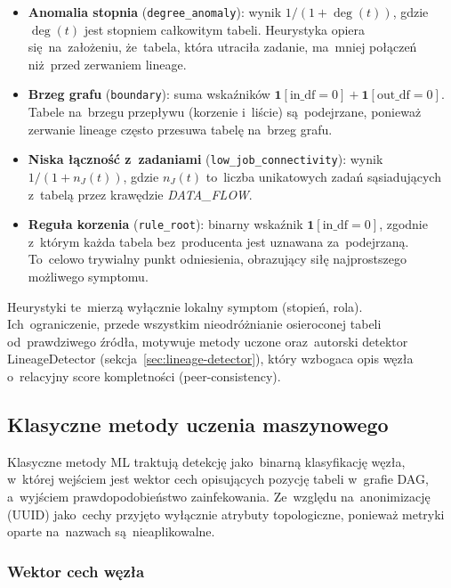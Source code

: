 \begin{itemize}
  \item \textbf{Anomalia stopnia} (\texttt{degree\_anomaly}): wynik
        $1/(1+\deg(t))$, gdzie $\deg(t)$ jest stopniem całkowitym tabeli.
        Heurystyka opiera się~na~założeniu, że~tabela, która utraciła
        zadanie, ma~mniej połączeń niż~przed zerwaniem lineage.
  \item \textbf{Brzeg grafu} (\texttt{boundary}): suma wskaźników
        $\mathbf{1}[\mathrm{in\_df}=0] + \mathbf{1}[\mathrm{out\_df}=0]$.
        Tabele na~brzegu przepływu (korzenie i~liście) są~podejrzane,
        ponieważ zerwanie lineage często przesuwa tabelę na~brzeg grafu.
  \item \textbf{Niska łączność z~zadaniami}
        (\texttt{low\_job\_connectivity}): wynik $1/(1+n_{J}(t))$,
        gdzie $n_{J}(t)$ to~liczba unikatowych zadań sąsiadujących
        z~tabelą przez krawędzie \emph{DATA\_FLOW}.
  \item \textbf{Reguła korzenia} (\texttt{rule\_root}): binarny wskaźnik
        $\mathbf{1}[\mathrm{in\_df}=0]$, zgodnie z~którym każda tabela
        bez~producenta jest uznawana za~podejrzaną. To~celowo trywialny punkt odniesienia,
        obrazujący siłę najprostszego możliwego symptomu.
\end{itemize}

Heurystyki te~mierzą wyłącznie lokalny symptom (stopień, rola).
Ich~ograniczenie, przede wszystkim nieodróżnianie osieroconej tabeli
od~prawdziwego źródła, motywuje metody uczone oraz~autorski detektor
LineageDetector (sekcja~\ref{sec:lineage-detector}), który wzbogaca opis
węzła o~relacyjny score kompletności (peer-consistency).

\subsection{Klasyczne metody uczenia maszynowego}
\label{sec:ml}

Klasyczne metody ML traktują detekcję jako~binarną klasyfikację węzła, w~której
wejściem jest wektor cech opisujących pozycję tabeli w~grafie DAG,
a~wyjściem prawdopodobieństwo zainfekowania. Ze~względu na~anonimizację
(UUID) jako~cechy przyjęto wyłącznie atrybuty topologiczne, ponieważ metryki
oparte na~nazwach są~nieaplikowalne.

\subsubsection{Wektor cech węzła}

